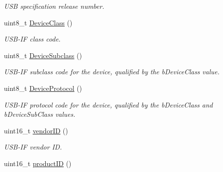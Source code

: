 \begin{DoxyCompactItemize}
\begin{DoxyCompactList}\small\item\em U\-S\-B specification release number. \end{DoxyCompactList}\item 
\hypertarget{class_lib_u_s_b_1_1_device_a1e20bb4c9f2df68b470dcc6c9922a209}{uint8\-\_\-t \hyperlink{class_lib_u_s_b_1_1_device_a1e20bb4c9f2df68b470dcc6c9922a209}{Device\-Class} ()}\label{class_lib_u_s_b_1_1_device_a1e20bb4c9f2df68b470dcc6c9922a209}

\begin{DoxyCompactList}\small\item\em U\-S\-B-\/\-I\-F class code. \end{DoxyCompactList}\item 
\hypertarget{class_lib_u_s_b_1_1_device_a86766778e062854e0a7d7b264793e9aa}{uint8\-\_\-t \hyperlink{class_lib_u_s_b_1_1_device_a86766778e062854e0a7d7b264793e9aa}{Device\-Subclass} ()}\label{class_lib_u_s_b_1_1_device_a86766778e062854e0a7d7b264793e9aa}

\begin{DoxyCompactList}\small\item\em U\-S\-B-\/\-I\-F subclass code for the device, qualified by the b\-Device\-Class value. \end{DoxyCompactList}\item 
\hypertarget{class_lib_u_s_b_1_1_device_ab3ae560d2ab9bf058d39eb266e752d98}{uint8\-\_\-t \hyperlink{class_lib_u_s_b_1_1_device_ab3ae560d2ab9bf058d39eb266e752d98}{Device\-Protocol} ()}\label{class_lib_u_s_b_1_1_device_ab3ae560d2ab9bf058d39eb266e752d98}

\begin{DoxyCompactList}\small\item\em U\-S\-B-\/\-I\-F protocol code for the device, qualified by the b\-Device\-Class and b\-Device\-Sub\-Class values. \end{DoxyCompactList}\item 
\hypertarget{class_lib_u_s_b_1_1_device_a10d9993286eea8424f0d97bb5a0cbab6}{uint16\-\_\-t \hyperlink{class_lib_u_s_b_1_1_device_a10d9993286eea8424f0d97bb5a0cbab6}{vendor\-I\-D} ()}\label{class_lib_u_s_b_1_1_device_a10d9993286eea8424f0d97bb5a0cbab6}

\begin{DoxyCompactList}\small\item\em U\-S\-B-\/\-I\-F vendor I\-D. \end{DoxyCompactList}\item 
\hypertarget{class_lib_u_s_b_1_1_device_a5f3f9c76a5b6f10e70b71b63dcae575d}{uint16\-\_\-t \hyperlink{class_lib_u_s_b_1_1_device_a5f3f9c76a5b6f10e70b71b63dcae575d}{product\-I\-D} ()}\label{class_lib_u_s_b_1_1_device_a5f3f9c76a5b6f10e70b71b63dcae575d}


\end{DoxyCompactItemize}
